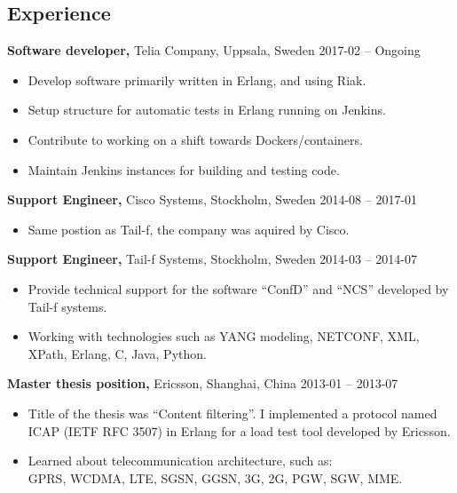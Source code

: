 \documentclass[margin]{res}
\begin{document}

\address{{\bf Contact information}\\

linkedin.com/in/tommymattsson\\
github.com/Taddic\\
}

\address{{\bf Address}\\
  \\
}

\begin{resume}

\section{Experience}
{\bf Software developer,} Telia Company, Uppsala, Sweden \hfill 2017-02 -- Ongoing
 \begin{itemize} \itemsep -2pt  %
 \item Develop software primarily written in Erlang, and using Riak.
 \item Setup structure for automatic tests in Erlang running on Jenkins.
 \item Contribute to working on a shift towards Dockers/containers.
 \item Maintain Jenkins instances for building and testing code.
 \end{itemize}

{\bf Support Engineer,} Cisco Systems, Stockholm, Sweden \hfill 2014-08 -- 2017-01
 \begin{itemize} \itemsep -2pt  %
 \item Same postion as Tail-f, the company was aquired by Cisco.
 \end{itemize}

{\bf Support Engineer,} Tail-f Systems, Stockholm, Sweden \hfill 2014-03 -- 2014-07
 \begin{itemize} \itemsep -2pt  %
 \item Provide technical support for the software ``ConfD'' and ``NCS''
   developed by Tail-f systems.
 \item Working with technologies such as YANG modeling, NETCONF,
   XML, XPath, Erlang, C, Java, Python.
 \end{itemize}

{\bf Master thesis position,} Ericsson, Shanghai, China \hfill 2013-01 -- 2013-07
 \begin{itemize} \itemsep -2pt  %
 \item Title of the thesis was ``Content filtering''. I implemented a protocol named
   ICAP (IETF RFC 3507) in Erlang for a load test tool
   developed by Ericsson.
 \item Learned about telecommunication architecture, such as: \\
 GPRS, WCDMA, LTE, SGSN, GGSN, 3G, 2G, PGW, SGW, MME.
 \end{itemize}


\end{resume}
\end{document}
